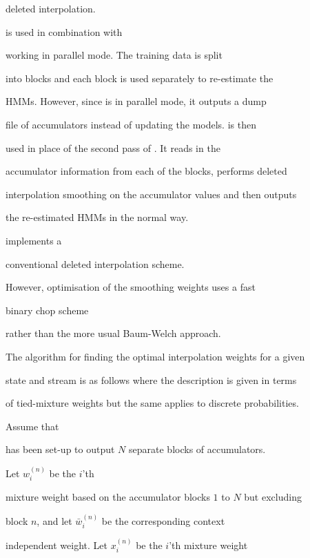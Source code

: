 deleted interpolation.  





 is used in combination with 


working in parallel mode.  The training data is split


into blocks and each block is used separately to re-estimate the


HMMs.  However, since  is in parallel mode, it outputs a dump


file of accumulators instead of updating the models.   is then


used in place of the second pass of .  It reads in the 


accumulator information from each of the blocks, performs deleted


interpolation smoothing on the accumulator values and then outputs


the re-estimated HMMs in the normal way.





 implements a 


conventional deleted interpolation scheme.


However, optimisation of the smoothing weights uses a fast 


binary chop scheme 


rather than the more usual Baum-Welch approach.


The algorithm for finding the optimal interpolation weights for a given


state and stream is as follows where the description is given in terms


of tied-mixture weights but the same applies to discrete probabilities.  





Assume that 


has been set-up to output $N$ separate blocks of accumulators.


Let $w_i^{(n)}$ be the $i$'th


mixture weight based on the accumulator blocks $1$ to $N$ but excluding


block $n$, and let $\bar{w}_i^{(n)}$ be the corresponding context


independent weight.  Let $x_i^{(n)}$ be the $i$'th mixture weight 



